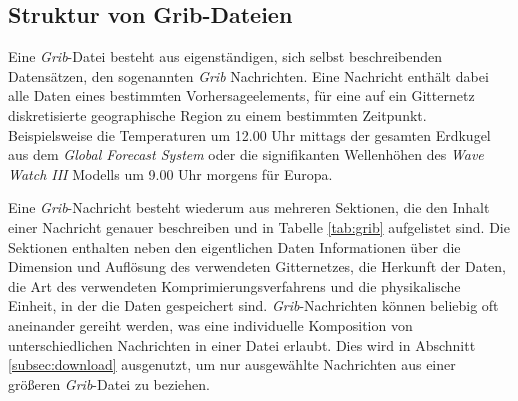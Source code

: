 \subsection{Struktur von Grib-Dateien}
Eine \textit{Grib}-Datei besteht aus eigenständigen, sich selbst
beschreibenden Datensätzen, den sogenannten \textit{Grib}
Nachrichten. Eine Nachricht enthält dabei alle Daten eines bestimmten
Vorhersageelements, für eine auf ein Gitternetz diskretisierte
geographische Region zu einem bestimmten Zeitpunkt. Beispielsweise die
Temperaturen um 12.00 Uhr mittags der gesamten Erdkugel aus dem
\textit{Global Forecast System} oder die signifikanten Wellenhöhen des
\textit{Wave Watch III} Modells um 9.00 Uhr morgens für Europa.

Eine \textit{Grib}-Nachricht besteht wiederum aus mehreren Sektionen,
die den Inhalt einer Nachricht genauer beschreiben und in Tabelle
\ref{tab:grib} aufgelistet sind. Die Sektionen enthalten neben den
eigentlichen Daten Informationen über die Dimension und Auflösung des
verwendeten Gitternetzes, die Herkunft der Daten, die Art des
verwendeten Komprimierungsverfahrens und die physikalische Einheit, in
der die Daten gespeichert sind. \textit{Grib}-Nachrichten können
beliebig oft aneinander gereiht werden, was eine individuelle
Komposition von unterschiedlichen Nachrichten in einer Datei
erlaubt. Dies wird in Abschnitt \ref{subsec:download} ausgenutzt, um
nur ausgewählte Nachrichten aus einer größeren \textit{Grib}-Datei zu
beziehen.

